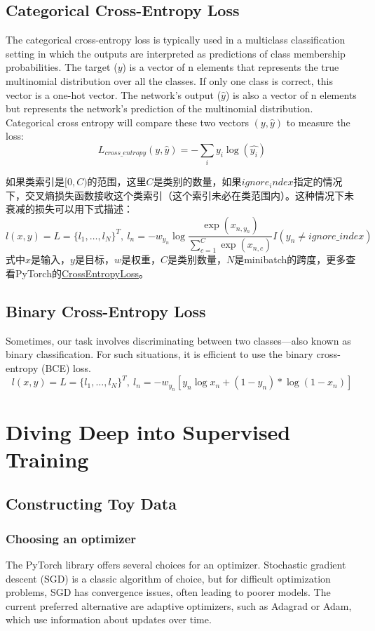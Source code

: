 \subsection{Categorical Cross-Entropy Loss}
The categorical cross-entropy loss is typically used in a multiclass classification setting in which the outputs are interpreted as predictions of class membership probabilities. The target ($y$) is a vector of n elements that represents the true multinomial distribution over all the classes. If only one class is correct, this vector is a one-hot
vector. The network's output ($\hat{y}$) is also a vector of n elements but represents the network's prediction of the multinomial distribution. Categorical cross entropy will
compare these two vectors $(y,\hat{y})$ to measure the loss:
$$L_{cross\_entropy}(y,\hat{y})=-\sum_{i}y_i\log(\hat{y_i})$$

如果类索引是$[0, C)$的范围，这里$C$是类别的数量，如果$ignore_index$指定的情况下，交叉熵损失函数接收这个类索引（这个索引未必在类范围内）。这种情况下未衰减的损失可以用下式描述：
\begin{equation}
    l(x,y)=L=\{l_1, \dots, l_N\}^T,~l_n=-w_{y_n}\log\frac{\exp(x_{n,y_n})}{\sum\limits_{c=1}^{C}\exp(x_{n,c})}I(y_n\neq ignore\_index)
\end{equation}
式中$x$是输入，$y$是目标，$w$是权重，$C$是类别数量，$N$是minibatch的跨度，更多查看PyTorch的\href{https://pytorch.org/docs/stable/generated/torch.nn.CrossEntropyLoss.html}{CrossEntropyLoss}。
\subsection{Binary Cross-Entropy Loss}
Sometimes, our task involves discriminating between two classes—also known as binary classification. For such situations, it is efficient to use the binary cross-entropy (BCE) loss.
\begin{equation}
    l(x,y)=L=\{l_1, \dots, l_N\}^T,~l_n=-w_{y_n}[y_n\log x_n+(1-y_n)*\log (1-x_n)]
\end{equation}

\section{Diving Deep into Supervised Training}
\subsection{Constructing Toy Data}
\subsubsection*{Choosing an optimizer}
The PyTorch library offers several choices for an optimizer. Stochastic gradient
descent (SGD) is a classic algorithm of choice, but for difficult optimization problems, SGD has convergence issues, often leading to poorer models. The current preferred alternative are adaptive optimizers, such as Adagrad or Adam, which use
information about updates over time.
